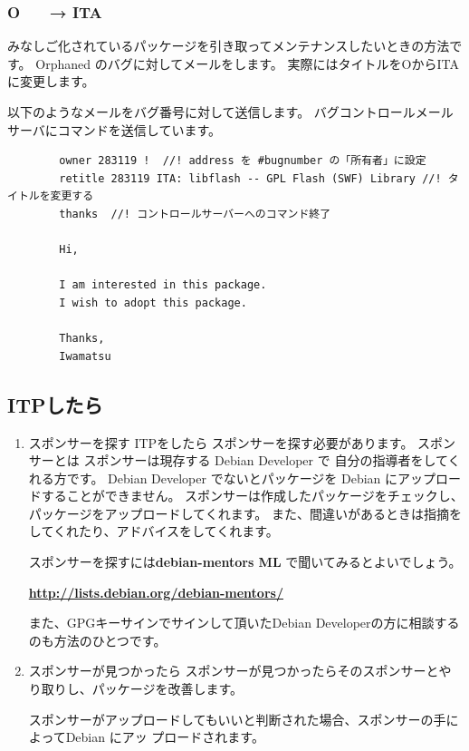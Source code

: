\documentclass[mingoth,a4paper]{jsarticle}
\begin{document}
    \subsubsection{ O　　→  ITA }
        みなしご化されているパッケージを引き取ってメンテナンスしたいときの方法です。
        Orphaned のバグに対してメールをします。
        実際にはタイトルをOからITAに変更します。
		
		以下のようなメールをバグ番号に対して送信します。
		バグコントロールメールサーバにコマンドを送信しています。

		\begin{verbatim}
        owner 283119 !	//! address を #bugnumber の「所有者」に設定
        retitle 283119 ITA: libflash -- GPL Flash (SWF) Library //! タイトルを変更する
        thanks	//! コントロールサーバーへのコマンド終了

        Hi,

        I am interested in this package.
        I wish to adopt this package.

        Thanks,
        Iwamatsu
		\end{verbatim}

		
\subsection{ITPしたら}

	\begin{enumerate}
    \item スポンサーを探す
        ITPをしたら スポンサーを探す必要があります。
        スポンサーとは スポンサーは現存する Debian Developer で 自分の指導者をしてくれる方です。
        Debian Developer でないとパッケージを Debian にアップロードすることができません。
        スポンサーは作成したパッケージをチェックし、パッケージをアップロードしてくれます。
        また、間違いがあるときは指摘をしてくれたり、アドバイスをしてくれます。
		
        スポンサーを探すには{\bf debian-mentors ML} で聞いてみるとよいでしょう。
		
        {\bf \url{http://lists.debian.org/debian-mentors/}}

        また、GPGキーサインでサインして頂いたDebian Developerの方に相談するのも方法のひとつです。
		
		
    \item スポンサーが見つかったら
        スポンサーが見つかったらそのスポンサーとやり取りし、パッケージを改善します。
		
        スポンサーがアップロードしてもいいと判断された場合、スポンサーの手によってDebian にアッ
        プロードされます。
	\end{enumerate}
\end{document}
